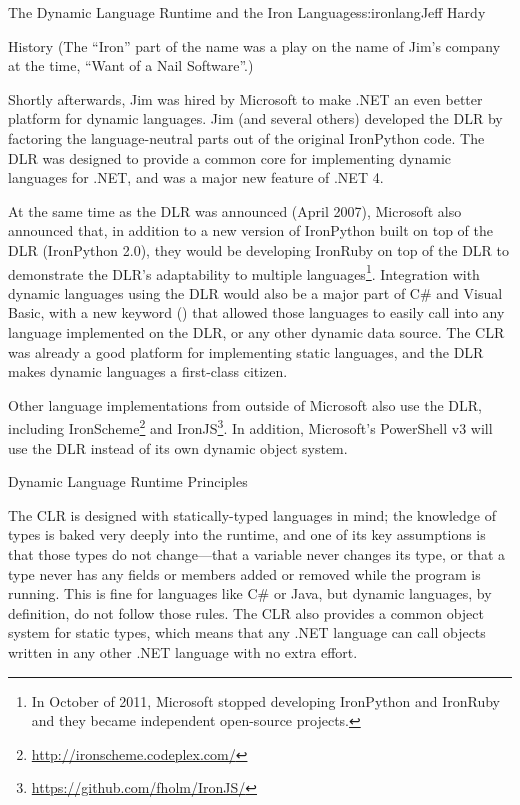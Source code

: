\begin{aosachapter}{The Dynamic Language Runtime and the Iron Languages}{s:ironlang}{Jeff Hardy}
\begin{aosasect1}{History}
\noindent
(The ``Iron'' part of the name was a play on the name of Jim's company at the
time, ``Want of a Nail Software''.)

Shortly afterwards, Jim was hired by Microsoft to make .NET an even better
platform for dynamic languages. Jim (and several others) developed the DLR by
factoring the language-neutral parts out of the original IronPython code. The
DLR was designed to provide a common core for implementing dynamic languages
for .NET, and was a major new feature of .NET 4.

At the same time as the DLR was announced (April 2007), Microsoft also
announced that, in addition to a new version of IronPython built on top of the
DLR (IronPython 2.0), they would be developing IronRuby on top of the DLR
to demonstrate the DLR's adaptability to multiple languages\footnote{In October
of 2011, Microsoft stopped developing IronPython and IronRuby and they became
independent open-source projects.}. Integration with dynamic languages using
the DLR would also be a major part of C\# and Visual Basic, with a new keyword
() that allowed those languages to easily call into any language
implemented on the DLR, or any other dynamic data source. The CLR was already a
good platform for implementing static languages, and the DLR makes dynamic
languages a first-class citizen.

Other language implementations from outside of Microsoft also use the DLR,
including IronScheme\footnote{\url{http://ironscheme.codeplex.com/}} and
IronJS\footnote{\url{https://github.com/fholm/IronJS/}}. In addition,
Microsoft's PowerShell v3 will use the DLR instead of its own dynamic object
system.

\end{aosasect1}

\begin{aosasect1}{Dynamic Language Runtime Principles}

The CLR is designed with statically-typed languages in mind; the knowledge of
types is baked very deeply into the runtime, and one of its key assumptions is
that those types do not change---that a variable never changes its type, or
that a type never has any fields or members added or removed while the program
is running. This is fine for languages like C\# or Java, but dynamic languages,
by definition, do not follow those rules. The CLR also provides a common object
system for static types, which means that any .NET language can call objects
written in any other .NET language with no extra effort.


\end{aosasect1}
\end{aosachapter}
